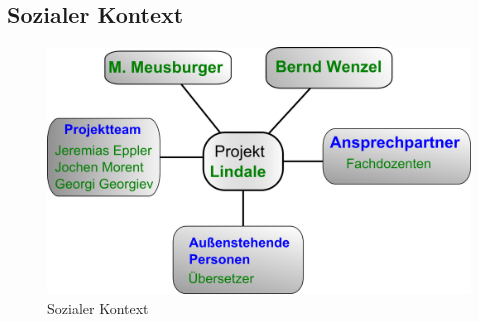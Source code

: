 \subsection{Sozialer Kontext}
\begin{figure}[!ht]
\center
\includegraphics[width=\linewidth]{images/sozialer-kontetxt}
\caption{Sozialer Kontext}
\end{figure}